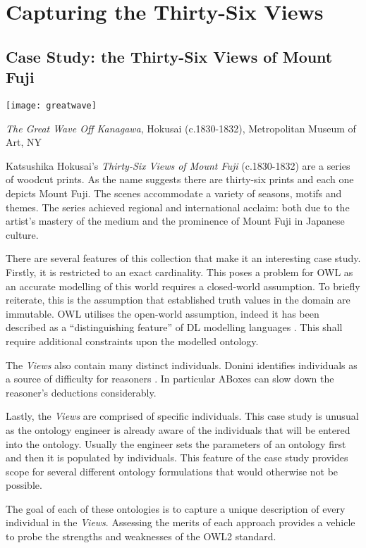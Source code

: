 \documentclass[titlepage,a4paper,12pt,oneside]{book}
\begin{document}
\chapter{Capturing the Thirty-Six Views}
\section{Case Study: the Thirty-Six Views of Mount Fuji}
\centerline{\texttt{[image: greatwave]}}
\centerline{\textit{The Great Wave Off Kanagawa}, Hokusai (c.1830-1832), Metropolitan Museum of Art, NY}\hfill \break
Katsushika Hokusai's \textit{Thirty-Six Views of Mount Fuji} (c.1830-1832) are a series of woodcut prints.
As the name suggests there are thirty-six prints and each one depicts Mount Fuji.
The scenes accommodate a variety of seasons, motifs and themes.
The series achieved regional and international acclaim: both due to the artist's mastery of the medium and the prominence of Mount Fuji in Japanese culture.\par
There are several features of this collection that make it an interesting case study.
Firstly, it is restricted to an exact cardinality.
This poses a problem for OWL as an accurate modelling of this world requires a closed-world assumption.
To briefly reiterate, this is the assumption that established truth values in the domain are immutable.
OWL utilises the open-world assumption, indeed it has been described as a ``distinguishing feature'' of DL modelling languages \cite[11]{handbookIntro2003}. This shall require additional constraints upon the modelled ontology.\par
The \textit{Views} also contain many distinct individuals.
Donini identifies individuals as a source of difficulty for reasoners \cite[135]{donini2003}.
In particular ABoxes can slow down the reasoner's deductions considerably.\par
Lastly, the \textit{Views} are comprised of specific individuals.
This case study is unusual as the ontology engineer is already aware of the individuals that will be entered into the ontology.
Usually the engineer sets the parameters of an ontology first and then it is populated by individuals.
This feature of the case study provides scope for several different ontology formulations that would otherwise not be possible.\par
The goal of each of these ontologies is to capture a unique description of every individual in the \textit{Views}.
Assessing the merits of each approach provides a vehicle to probe the strengths and weaknesses of the OWL2 standard.
\end{document}
